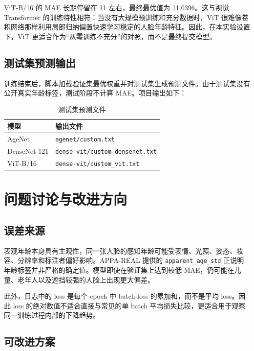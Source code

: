 \documentclass[12pt,a4paper,fontset=fandol]{ctexart}
\begin{document}
ViT-B/16 的 MAE 长期停留在 11 左右，最终最优值为 11.0396。这与视觉 Transformer 的训练特性相符：当没有大规模预训练和充分数据时，ViT 很难像卷积网络那样利用局部归纳偏置快速学习稳定的人脸年龄特征。因此，在本实验设置下，ViT 更适合作为“从零训练不充分”的对照，而不是最终提交模型。

\subsection{测试集预测输出}

训练结束后，脚本加载验证集最优权重并对测试集生成预测文件。由于测试集没有公开真实年龄标签，测试阶段不计算 MAE。项目输出如下：

\begin{table}[H]
  \centering
  \caption{测试集预测文件}
  \begin{tabular}{ll}
    \toprule
    模型 & 输出文件 \\
    \midrule
    AgeNet & \texttt{agenet/custom.txt} \\
    DenseNet-121 & \texttt{dense-vit/custom\_densenet.txt} \\
    ViT-B/16 & \texttt{dense-vit/custom\_vit.txt} \\
    \bottomrule
  \end{tabular}
\end{table}

\section{问题讨论与改进方向}

\subsection{误差来源}

表观年龄本身具有主观性，同一张人脸的感知年龄可能受表情、光照、姿态、妆容、分辨率和标注者偏好影响。APPA-REAL 提供的 \texttt{apparent\_age\_std} 正说明年龄标签并非严格的确定值。模型即使在验证集上达到较低 MAE，仍可能在儿童、老年人以及遮挡较强的人脸上出现更大偏差。

此外，日志中的 loss 是每个 epoch 中 batch loss 的累加和，而不是平均 loss。因此 loss 的绝对数值不适合直接与常见的单 batch 平均损失比较，更适合用于观察同一训练过程内部的下降趋势。

\subsection{可改进方案}
\end{document}
